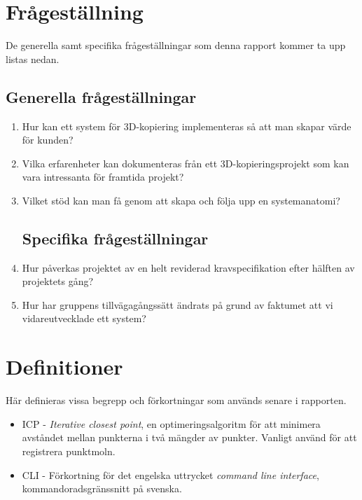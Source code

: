 \section{Frågeställning}
De generella samt specifika frågeställningar som denna rapport kommer ta upp listas nedan.

\subsection{Generella frågeställningar}
\label{sec:research-questions-general}

\begin{enumerate}
	\item Hur kan ett system för 3D-kopiering implementeras så att man skapar värde för kunden?
	\item Vilka erfarenheter kan dokumenteras från ett 3D-kopieringsprojekt som kan vara intressanta för framtida projekt?
	\item Vilket stöd kan man få genom att skapa och följa upp en systemanatomi?
	
\subsection{Specifika frågeställningar}
\label{sec:research-questions-specific}
	
	\item Hur påverkas projektet av en helt reviderad kravspecifikation efter hälften av projektets gång?
	\item Hur har gruppens tillvägagångssätt ändrats på grund av faktumet att vi vidareutvecklade ett system? 
	
\end{enumerate}

\section{Definitioner}
\label{sec:definitions}
Här definieras vissa begrepp och förkortningar som används senare i rapporten.

\begin{itemize}
\item ICP - \textit{Iterative closest point}, en optimeringsalgoritm för att minimera avståndet mellan punkterna i två mängder av punkter. Vanligt använd för att registrera punktmoln. 
\item CLI - Förkortning för det engelska uttrycket \textit{command line interface}, kommandoradsgränssnitt på svenska. 
\end{itemize} 

